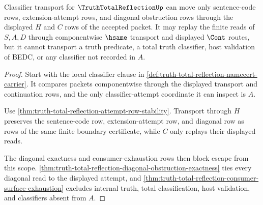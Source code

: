 \begin{theorem}
\label{thm:truth-total-reflection-classifier-transport-scope}
Classifier transport for $\TruthTotalReflectionUp$ can move only sentence-code rows, extension-attempt rows, and diagonal obstruction rows through the displayed $H$ and $C$ rows of the accepted packet. It may replay the finite reads of $S,A,D$ through componentwise $\hsame$ transport and displayed $\Cont$ routes, but it cannot transport a truth predicate, a total truth classifier, host validation of BEDC, or any classifier not recorded in $A$.
\end{theorem}
\begin{proof}
Start with the local classifier clause in \autoref{def:truth-total-reflection-namecert-carrier}. It compares packets componentwise through the displayed transport and continuation rows, and the only classifier-attempt coordinate it can inspect is $A$.

Use \autoref{thm:truth-total-reflection-attempt-row-stability}. Transport through $H$ preserves the sentence-code row, extension-attempt row, and diagonal row as rows of the same finite boundary certificate, while $C$ only replays their displayed reads.

The diagonal exactness and consumer-exhaustion rows then block escape from this scope. \autoref{thm:truth-total-reflection-diagonal-obstruction-exactness} ties every diagonal read to the displayed attempt, and \autoref{thm:truth-total-reflection-consumer-surface-exhaustion} excludes internal truth, total classification, host validation, and classifiers absent from $A$.
\end{proof}

